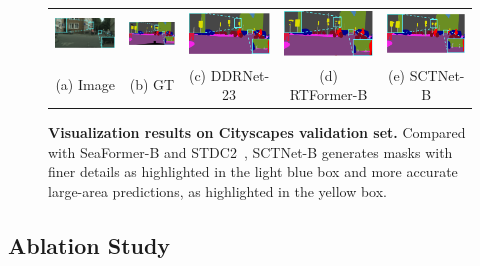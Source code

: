 \documentclass[letterpaper]{article} %
\begin{document}
\begin{figure}[!t]
\begin{tabular}{ccccc}
  \includegraphics[width=0.19\linewidth]{image/figure6/3a.png}\label{3a} &
  \hspace{-12pt}
  \includegraphics[width=0.19\linewidth]{image/figure6/3b.png}\label{3b} &
  \hspace{-12pt}
  \includegraphics[width=0.19\linewidth]{image/figure6/3c.png}\label{3c} &
  \hspace{-12pt}
  \includegraphics[width=0.19\linewidth]{image/figure6/3d.png}\label{3d} &
  \hspace{-12pt}
  \includegraphics[width=0.19\linewidth]{image/figure6/3e.png}\label{3e} \\
  (a) Image & (b) GT & (c) DDRNet-23 & (d) RTFormer-B& (e) SCTNet-B\\
  \end{tabular}
  \caption{\textbf{Visualization results on Cityscapes validation set.} Compared with SeaFormer-B\cite{wan2023seaformer} and STDC2~\cite{fan2021rethinking}, SCTNet-B generates masks with finer details as highlighted in the light blue box and more accurate large-area predictions, as highlighted in the yellow box.
      }
  \label{fig:vis_cityscapes}

  \end{figure}

\subsection{Ablation Study}
\end{document}
